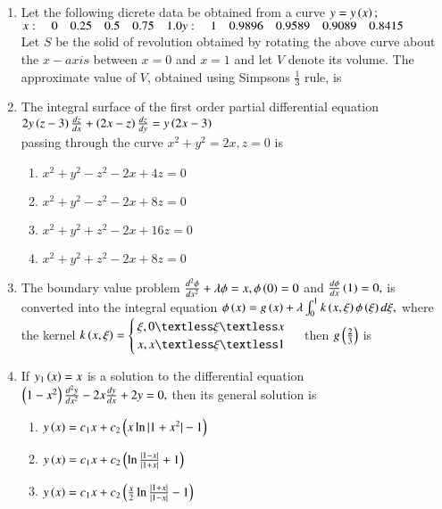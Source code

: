\documentclass[journal]{IEEEtran}
\begin{document}
\begin{enumerate}
    \item Let the following dicrete data be obtained from a curve $y=y\left(x\right);$\\
    $x: \quad 0 \quad 0.25  \quad 0.5  \quad  0.75  \quad 1.0\\
    y: \quad 1 \quad 0.9896 \quad 0.9589\quad 0.9089 \quad 0.8415$\\
    Let $S$ be the solid of revolution obtained by rotating the above curve about the $x-axis$ between $x=0$ and $x=1$ and let $V$ denote its volume. The approximate value of $V$, obtained using Simpsons $\frac{1}{3}$ rule, is\\
    \item The integral surface of the first order partial differential equation\\
    $2y\left(z-3\right)\frac{dz}{dx}+\left(2x-z\right)\frac{dz}{dy}=y\left(2x-3\right)$\\
    passing through the curve $x^2+y^2=2x,z=0$ is
    \begin{enumerate}
        \item $x^2+y^2-z^2-2x+4z=0$
        \item $x^2+y^2-z^2-2x+8z=0$
        \item $x^2+y^2+z^2-2x+16z=0$
        \item $x^2+y^2+z^2-2x+8z=0$\\
    \end{enumerate}
    \item The boundary value problem $\frac{d^2\phi}{dx^2}+\lambda\phi=x, \phi\left(0\right)=0$ and $\frac{d\phi}{dx}\left(1\right)=0,$ is converted into the integral equation $\phi\left(x\right)=g\left(x\right)+\lambda\int_{0}^{1}k\left(x,\xi\right)\phi\left(\xi\right)d\xi,$ where the kernel $k\brak{x,\xi }=\begin{cases}
    \xi,0\textless\xi\textless x\\x,x\textless \xi \textless 1
    \end{cases} $ then $g\left(\frac{2}{3}\right)$ is\\
    \item If $y_1\left(x\right)=x$ is a solution to the differential equation $\left(1-x^2\right)\frac{d^2y}{dx^2}-2x\frac{dy}{dx}+2y=0,$ then its general solution is 
    \begin{enumerate}
        \item $y\left(x\right)=c_1x+c_2\left(x\ln|1+x^2|-1\right)$
        \item $y\left(x\right)=c_1x+c_2\left(\ln\frac{|1-x|}{|1+x|}+1\right)$
        \item $y\left(x\right)=c_1x+c_2\left(\frac{x}{2}\ln\frac{|1+x|}{|1-x|}-1\right)$

\end{enumerate}
\end{enumerate}
\end{document}
